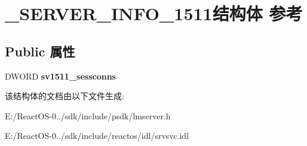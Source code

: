 \hypertarget{struct___s_e_r_v_e_r___i_n_f_o__1511}{}\section{\+\_\+\+S\+E\+R\+V\+E\+R\+\_\+\+I\+N\+F\+O\+\_\+1511结构体 参考}
\label{struct___s_e_r_v_e_r___i_n_f_o__1511}
\subsection*{Public 属性}
\begin{DoxyCompactItemize}
\item 
\mbox{\label{struct___s_e_r_v_e_r___i_n_f_o__1511_a4de801e34d874bc387d1802aee052377}} 
D\+W\+O\+RD {\bfseries sv1511\+\_\+sessconns}
\end{DoxyCompactItemize}


该结构体的文档由以下文件生成\+:\begin{DoxyCompactItemize}
\item 
E\+:/\+React\+O\+S-\/0../sdk/include/psdk/lmserver.\+h\item 
E\+:/\+React\+O\+S-\/0../sdk/include/reactos/idl/srvsvc.\+idl\end{DoxyCompactItemize}
